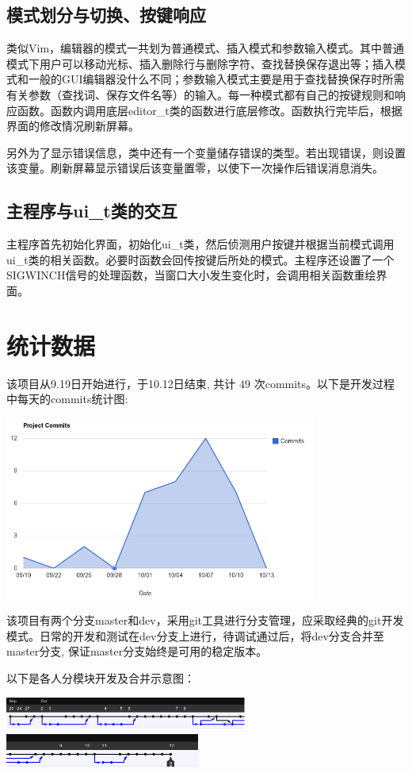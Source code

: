 \documentclass[a4paper,9pt]{article}
\begin{document}
\subsection{模式划分与切换、按键响应}
类似Vim，编辑器的模式一共划为普通模式、插入模式和参数输入模式。其中普通模式下用户可以移动光标、插入删除行与删除字符、查找替换保存退出等；插入模式和一般的GUI编辑器没什么不同；参数输入模式主要是用于查找替换保存时所需有关参数（查找词、保存文件名等）的输入。每一种模式都有自己的按键规则和响应函数。函数内调用底层editor\_t类的函数进行底层修改。函数执行完毕后，根据界面的修改情况刷新屏幕。

另外为了显示错误信息，类中还有一个变量储存错误的类型。若出现错误，则设置该变量。刷新屏幕显示错误后该变量置零，以使下一次操作后错误消息消失。

\subsection{主程序与ui\_t类的交互}
主程序首先初始化界面，初始化ui\_t类，然后侦测用户按键并根据当前模式调用ui\_t类的相关函数。必要时函数会回传按键后所处的模式。主程序还设置了一个SIGWINCH信号的处理函数，当窗口大小发生变化时，会调用相关函数重绘界面。

\section{统计数据}
该项目从9.19日开始进行，于10.12日结束, 共计 $49$ 次commits。以下是开发过程中每天的commits统计图:

\begin{center}
\includegraphics[height=6cm]{commits.png}
\end{center}

该项目有两个分支master和dev，采用git工具进行分支管理，应采取经典的git开发模式。日常的开发和测试在dev分支上进行，待调试通过后，将dev分支合并至master分支, 保证master分支始终是可用的稳定版本。

以下是各人分模块开发及合并示意图：
\vspace{1.5em}
\begin{center}
	\includegraphics[height=1.1cm]{branch1.png}
	\includegraphics[height=1.1cm]{branch2.png}
\end{center}
\end{document}
